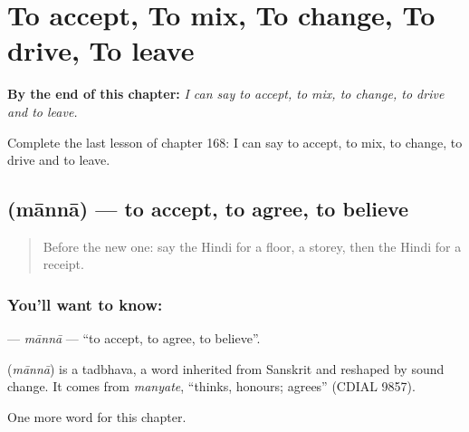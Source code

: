 
\chapter{To accept, To mix, To change, To drive, To leave}
\label{ch:hi-to-accept-to-mix-to-change-to-drive-to-leave}

\begin{chapteropening}
\textbf{By the end of this chapter:} \emph{I can say to accept, to mix, to change, to drive and to leave.}

Complete the last lesson of chapter 168: I can say to accept, to mix, to change, to drive and to leave.
\end{chapteropening}

\section[\texorpdfstring{\hi{मानना} (mānnā)}{मानना (mānnā)}]{ (mānnā) — to accept, to agree, to believe}

\label{lesson:HI-C168-manna}



\begin{quote}
Before the new one: say the Hindi for a floor, a storey, then the Hindi for a receipt.
\end{quote}

\subsection*{You'll want to know: }
\textbf{} — \emph{mānnā} — \textquotedblleft{}to accept, to agree, to believe\textquotedblright{}.

\begin{cousinweb}
\textbf{} (\emph{mānnā}) is a tadbhava, a word inherited from Sanskrit and reshaped by sound change. It comes from \emph{manyate}, \textquotedblleft{}thinks, honours; agrees\textquotedblright{} (CDIAL 9857).
\end{cousinweb}

\begin{grammarlens}[title={What you've built}]
One more word for this chapter.
\end{grammarlens}

